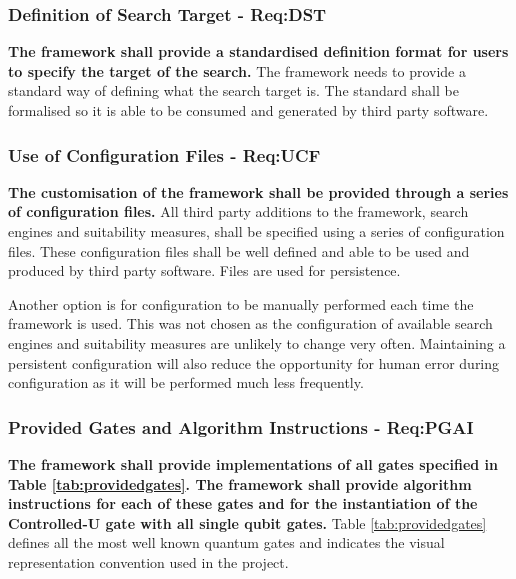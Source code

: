 \subsubsection{Definition of Search Target - Req:DST}
\label{sec:reqdst}
\textbf{The framework shall provide a standardised definition format for users to specify the target of the search.}
The framework needs to provide a standard way of defining what the search target is.
The standard shall be formalised so it is able to be consumed and generated by third party software.

\subsubsection{Use of Configuration Files - Req:UCF}
\label{sec:requcf}
\textbf{The customisation of the framework shall be provided through a series of configuration files.}
All third party additions to the framework, search engines and suitability measures, shall be specified using a series of configuration files.
These configuration files shall be well defined and able to be used and produced by third party software.
Files are used for persistence.

Another option is for configuration to be manually performed each time the framework is used.
This was not chosen as the configuration of available search engines and suitability measures are unlikely to change very often.
Maintaining a persistent configuration will also reduce the opportunity for human error during configuration as it will be performed much less frequently.

\subsubsection{Provided Gates and Algorithm Instructions - Req:PGAI}
\label{sec:reqpgai}
\textbf{The framework shall provide implementations of all gates specified in Table \ref{tab:providedgates}.
The framework shall provide algorithm instructions for each of these gates and for the instantiation of the Controlled-U gate with all single qubit gates.}
Table \ref{tab:providedgates} defines all the most well known quantum gates and indicates the visual representation convention used in the project.

